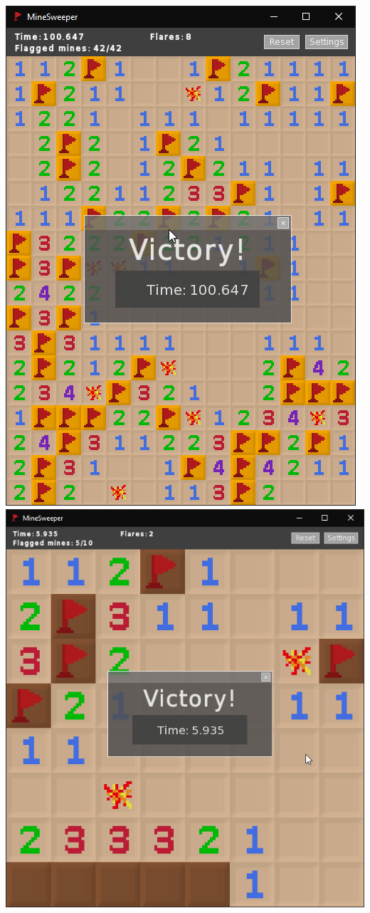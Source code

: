 \documentclass[12pt,a4paper]{article}
\begin{document}
\includegraphics[scale=0.45]{g2}
\includegraphics[scale=0.36]{g1}
\end{document}

